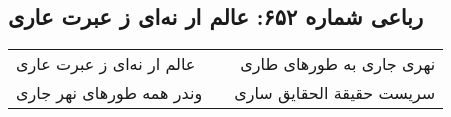 \begin{center}
\section*{رباعی شماره ۶۵۲: عالم ار نه‌ای ز عبرت عاری}
\label{sec:sh652}
\begin{longtable}{l p{0.5cm} r}
عالم ار نه‌ای ز عبرت عاری
&&
نهری جاری به طورهای طاری
\\
وندر همه طورهای نهر جاری
&&
سریست حقیقة الحقایق ساری
\\
\end{longtable}
\end{center}
